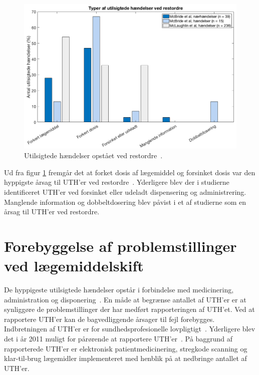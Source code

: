 \begin{figure}[H]\centering
	\includegraphics[width=1\textwidth]{billeder/UTH2.png} 
	\caption{Utilsigtede hændelser opstået ved restordre~\citep{McLaughlin2013,McBride2013}.}
	\label{fig:UTHrestordre}  
\end{figure}

Ud fra figur \ref{fig:UTHrestordre} fremgår det at forket dosis af lægemiddel og forsinket dosis var den hyppigste årsag til UTH'er ved restordre~\citep{McLaughlin2013,McBride2013}. Yderligere blev der i studierne identificeret UTH'er ved forsinket eller udeladt dispensering og administrering. Manglende information og dobbeltdosering blev påvist i et af studierne som en årsag til UTH'er ved restordre.~\citep{McLaughlin2013,McBride2013}

\section{Forebyggelse af problemstillinger ved lægemiddelskift}
De hyppigeste utilsigtede hændelser opstår i forbindelse med medicinering, administration og disponering~\citep{Jensen2014}. 
En måde at begrænse antallet af UTH'er er at synliggøre de problemstillinger der har medført rapporteringen af UTH'et. Ved at rapportere UTH'er kan de bagvedliggende årsager til fejl forebygges. Indbretningen af UTH'er er for sundhedsprofesionelle lovpligtigt~\citep{Jensen2014}. Yderligere blev det i år 2011 muligt for pårørende at rapportere UTH'er~\citep{Jensen2014}. På baggrund af rapporterede UTH'er er elektronisk patientmedicinering, stregkode scanning og klar-til-brug lægemidler implementeret med henblik på at nedbringe antallet af UTH'er.

